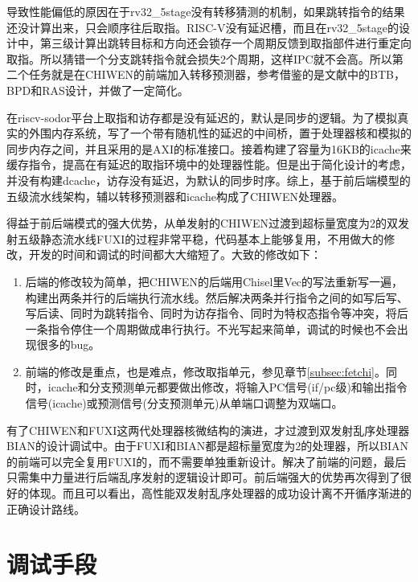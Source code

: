 导致性能偏低的原因在于rv32\_5stage没有转移猜测的机制，如果跳转指令的结果还没计算出来，只会顺序往后取指。RISC-V没有延迟槽，而且在rv32\_5stage的设计中，第三级计算出跳转目标和方向还会锁存一个周期反馈到取指部件进行重定向取指。所以猜错一个分支跳转指令就会损失2个周期，这样IPC就不会高。所以第二个任务就是在CHIWEN的前端加入转移预测器，参考借鉴的是文献\citet{Celio:EECS-2017-157}中的BTB，BPD和RAS设计，并做了一定简化。

在riscv-sodor平台上取指和访存都是没有延迟的，默认是同步的逻辑。为了模拟真实的外围内存系统，写了一个带有随机性的延迟的中间桥，置于处理器核和模拟的同步内存之间，并且采用的是AXI的标准接口。接着构建了容量为16KB的icache来缓存指令，提高在有延迟的取指环境中的处理器性能。但是出于简化设计的考虑，并没有构建dcache，访存没有延迟，为默认的同步时序。综上，基于前后端模型的五级流水线架构，辅以转移预测器和icache构成了CHIWEN处理器。

得益于前后端模式的强大优势，从单发射的CHIWEN过渡到超标量宽度为2的双发射五级静态流水线FUXI的过程非常平稳，代码基本上能够复用，不用做大的修改，开发的时间和调试的时间都大大缩短了。大致的修改如下：
\begin{enumerate}[label=(\alph*)]
	\item 后端的修改较为简单，把CHIWEN的后端用Chisel里Vec的写法重新写一遍，构建出两条并行的后端执行流水线。然后解决两条并行指令之间的如写后写、写后读、同时为跳转指令、同时为访存指令、同时为特权态指令等冲突，将后一条指令停住一个周期做成串行执行。不光写起来简单，调试的时候也不会出现很多的bug。
	\item 前端的修改是重点，也是难点，修改取指单元，参见章节\ref{subsec:fetchi}。同时，icache和分支预测单元都要做出修改，将输入PC信号(if/pc级)和输出指令信号(icache)或预测信号(分支预测单元)从单端口调整为双端口。
\end{enumerate}

有了CHIWEN和FUXI这两代处理器核微结构的演进，才过渡到双发射乱序处理器BIAN的设计调试中。由于FUXI和BIAN都是超标量宽度为2的处理器，所以BIAN的前端可以完全复用FUXI的，而不需要单独重新设计。解决了前端的问题，最后只需集中力量进行后端乱序发射的逻辑设计即可。前后端强大的优势再次得到了很好的体现。而且可以看出，高性能双发射乱序处理器的成功设计离不开循序渐进的正确设计路线。

\section{调试手段}

